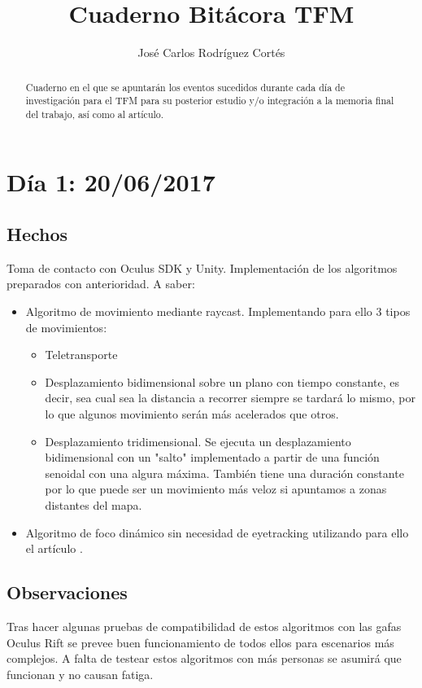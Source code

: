 \documentclass[12pt,a4paper]{article}
\author{José Carlos Rodríguez Cortés}
\title{Cuaderno Bitácora TFM}
\begin{document}
\maketitle
\begin{abstract}
Cuaderno en el que se apuntarán los eventos sucedidos durante cada día de investigación para el TFM para su posterior estudio y/o integración a la memoria final del trabajo, así como al artículo.
\end{abstract}
\break

\section{Día 1: 20/06/2017}

\subsection{Hechos}

Toma de contacto con Oculus SDK y Unity.
Implementación de los algoritmos preparados con anterioridad. A saber:

\begin{itemize}
\item Algoritmo de movimiento mediante raycast. Implementando para ello 3 tipos de movimientos:
	\begin{itemize}
	\item Teletransporte
	\item Desplazamiento bidimensional sobre un plano con tiempo constante, es decir, sea cual sea la distancia a recorrer siempre se tardará lo mismo, por lo que algunos movimiento serán más acelerados que otros.
	\item Desplazamiento tridimensional. Se ejecuta un desplazamiento bidimensional con un "salto" implementado a partir de una función senoidal con una algura máxima. También tiene una duración constante por lo que puede ser un movimiento más veloz si apuntamos a zonas distantes del mapa.
	\end{itemize}
\item Algoritmo de foco dinámico sin necesidad de eyetracking utilizando para ello el artículo \cite{Porcino et al.}.
\end{itemize}

\subsection{Observaciones}

Tras hacer algunas pruebas de compatibilidad de estos algoritmos con las gafas Oculus Rift se prevee buen funcionamiento de todos ellos para escenarios más complejos. A falta de testear estos algoritmos con más personas se asumirá que funcionan y no causan fatiga.
\end{document}
